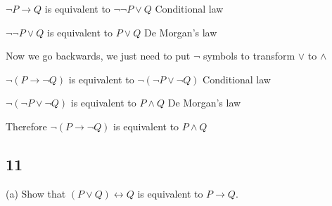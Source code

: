 \documentclass{article}
\begin{document}
$\neg P \rightarrow Q$ is equivalent to $\neg \neg P \lor Q$ Conditional law

$\neg \neg P \lor Q$ is equivalent to $P \lor Q$ De Morgan's law

Now we go backwards, we just need to put $\neg$ symbols to transform $\lor$ to $\land$

$\neg (P \rightarrow \neg Q)$ is equivalent to $\neg (\neg P \lor \neg Q)$ Conditional law

 $\neg (\neg P \lor \neg Q)$ is equivalent to $P \land Q$ De Morgan's law
 
 
 Therefore $\neg (P \rightarrow \neg Q)$ is equivalent to $P \land Q$
\subsection{11}
(a) Show that $(P \lor Q) \leftrightarrow Q$ is equivalent to $P \rightarrow Q$.
\end{document}
